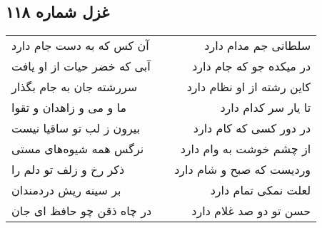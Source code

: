 \begin{center}
\section*{غزل شماره ۱۱۸}
\label{sec:sh118}
\begin{longtable}{l p{0.5cm} r}
آن کس که به دست جام دارد
&&
سلطانی جم مدام دارد
\\
آبی که خضر حیات از او یافت
&&
در میکده جو که جام دارد
\\
سررشته جان به جام بگذار
&&
کاین رشته از او نظام دارد
\\
ما و می و زاهدان و تقوا
&&
تا یار سر کدام دارد
\\
بیرون ز لب تو ساقیا نیست
&&
در دور کسی که کام دارد
\\
نرگس همه شیوه‌های مستی
&&
از چشم خوشت به وام دارد
\\
ذکر رخ و زلف تو دلم را
&&
وردیست که صبح و شام دارد
\\
بر سینه ریش دردمندان
&&
لعلت نمکی تمام دارد
\\
در چاه ذقن چو حافظ ای جان
&&
حسن تو دو صد غلام دارد
\\
\end{longtable}
\end{center}
